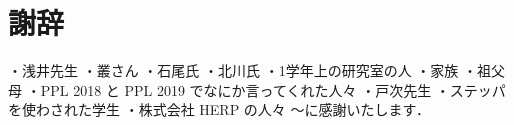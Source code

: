 \chapter*{謝辞}

・浅井先生
・叢さん
・石尾氏
・北川氏
・1学年上の研究室の人
・家族
・祖父母
・PPL 2018 と PPL 2019 でなにか言ってくれた人々
・戸次先生
・ステッパを使わされた学生
・株式会社 HERP の人々
〜に感謝いたします．
